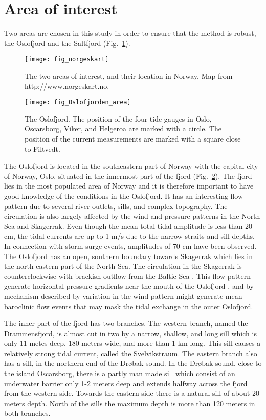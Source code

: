 \section{Area of interest}
Two areas are chosen in this study in order to ensure that the method is robust, the Oslofjord and the Saltfjord (Fig.~\ref{fig:area0}).

\begin{figure}[!t]
\centering
\texttt{[image: fig\_norgeskart]}
\caption{The two areas of interest, and their location in Norway. Map from http://www.norgeskart.no.}
\label{fig:area0}
\end{figure}

\begin{figure}[!t]
\centering
\texttt{[image: fig\_Oslofjorden\_area]}
\caption{The Oslofjord. The position of the four tide gauges in Oslo, Oscarsborg, Viker, and Helgeroa are marked with a circle. The position of the current measurements are marked with a square close to Filtvedt.}
\label{fig:area1}
\end{figure}

The Oslofjord is located in the southeastern part of Norway with the capital city of Norway, Oslo, situated in the innermost part of the fjord (Fig.~\ref{fig:area1}). The fjord lies in the most populated area of Norway and it is therefore important to have good knowledge of the conditions in the Oslofjord. It has an interesting flow pattern due to several river outlets, sills, and complex topography. The circulation is also largely affected by the wind and pressure patterns in the North Sea and Skagerrak. 
Even though the mean total tidal amplitude is less than 20 cm, the tidal currents are up to 1 m/s due to the narrow straits and sill depths. In connection with storm surge events, amplitudes of 70 cm have been observed. The Oslofjord has an open, southern boundary towards Skagerrak which lies in the north-eastern part of the North Sea. The circulation in the Skagerrak is counterclockwise with brackish outflow from the Baltic Sea \cite[]{rodhe96,svendsen96}. This flow pattern generate horizontal pressure gradients near the mouth of the Oslofjord \cite[]{baals90}, and by mechanism described by \cite{klinck81} variation in the wind pattern might generate mean baroclinic flow events that may mask the tidal exchange in the outer Oslofjord.

The inner part of the fjord has two branches. The western branch, named the Drammensfjord, is almost cut in two by a narrow, shallow, and long sill which is only 11 metes deep, 180 meters wide, and more than 1 km long. This sill causes a relatively strong tidal current, called the Svelvikstraum. The eastern branch also has a sill, in the northern end of the Dr{\o}bak sound. In the Dr{\o}bak sound, close to the island Oscarsborg, there is a partly man made sill which consist of an underwater barrier only 1-2 meters deep and extends halfway across the fjord from the western side. Towards the eastern side there is a natural sill of about 20 meters depth. North of the sills the maximum depth is more than 120 meters in both branches. 

